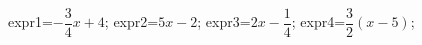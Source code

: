 \documentclass[exercice]{thedocument}%
\begin{document}
%
    \>expr1=$-\dfrac34x+4$;%
    \>expr2=$5x-2$;%
    \>expr3=$2x-\dfrac14$;%
    \>expr4=$\dfrac32(x-5)$;%
\end{document}
